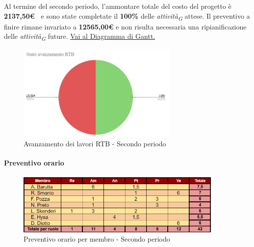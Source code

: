 \vspace{1cm}

Al termine del secondo periodo, l'ammontare totale del costo del progetto è \textbf{2137,50\euro\ } e sono state completate il \textbf{100\%} delle \textit{attività}\textsubscript{\textit{G}} attese.
Il preventivo a finire rimane invariato a \textbf{12565,00€} e non risulta necessaria una ripianificazione delle \textit{attività}\textsubscript{\textit{G}} future.
\href{https://github.com/orgs/ByteOps-swe/projects/3/views/1?sortedBy%5Bdirection%5D=asc&sortedBy%5BcolumnId%5D=64182560}{Vai al Diagramma di Gantt.}


\begin{figure}[H]
    \centering
    \begin{minipage}[b]{0.70\textwidth}
        \centering
        \includegraphics[width=0.7\textwidth]{../Images/avanzamento2Periodo.png}
        \caption{Avanzamento dei lavori RTB - Secondo periodo}
        \label{fig:Avanzamento_RTB_2}
    \end{minipage}
\end{figure}



\paragraph{Preventivo orario}

\begin{figure}[H]
    \centering
    \includegraphics[width=0.9\textwidth]{../Images/preventivoOrario2Periodo.png}
    \caption{Preventivo orario per membro - Secondo periodo}
    \label{fig:Preventivo_orario_2}
\end{figure}

